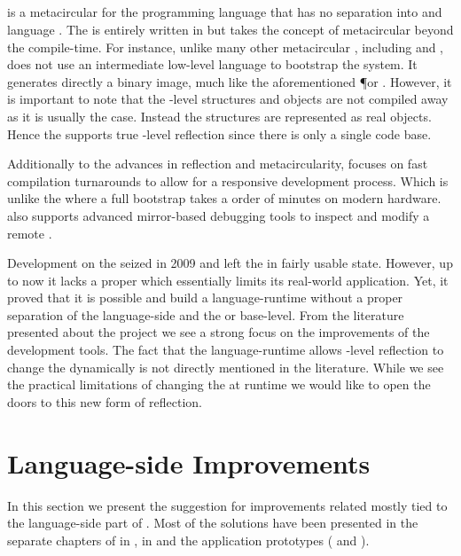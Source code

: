 \subsection{\Klein \VM}
 is a metacircular \VM for the \Self programming language that has no separation into \VM and language \cite{Unga05a}.
The \VM is entirely written in \Self but takes the concept of metacircular beyond the compile-time.
For instance, unlike many other metacircular \VMs, including \Cog and \Squeak, \Klein does not use an intermediate low-level language to bootstrap the system.
It generates directly a binary image, much like the aforementioned \P or \MIST \VM.
However, it is important to note that the \VM-level structures and objects are not compiled away as it is usually the case.
Instead the \VM structures are represented as real \Self objects.
Hence the \Klein \VM supports true \VM-level reflection since there is only a single code base.

Additionally to the advances in reflection and metacircularity, \Klein focuses on fast compilation turnarounds to allow for a responsive development process.
Which is unlike the \Squeak \VM where a full \VM bootstrap takes a order of minutes on modern hardware.
\Klein also supports advanced mirror-based debugging tools to inspect and modify a remote \VM.

Development on the \Klein \VM seized in 2009 and left the \Klein \VM in fairly usable state.
However, up to now it lacks a proper \GC which essentially limits its real-world application.
Yet, it proved that it is possible and build a language-runtime without a proper separation of the language-side and the \VM or base-level.
From the literature presented about the \Klein project we see a strong focus on the improvements of the development tools.
The fact that the language-runtime allows \VM-level reflection to change the \VM dynamically is not directly mentioned in the literature.
While we see the practical limitations of changing the \VM at runtime we would like to open the doors to this new form of reflection.



\section{Language-side Improvements}
In this section we present the suggestion for improvements related mostly tied to the language-side part of \B.
Most of the solutions have been presented in the separate chapters of \B in , \NB \FFI in  and the \B application prototypes ( and ).

